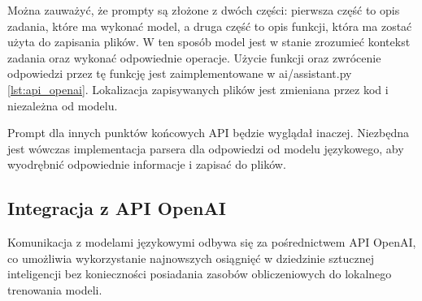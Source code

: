 Można zauważyć, że prompty są złożone z dwóch części: pierwsza część to opis zadania, które ma wykonać model, a druga część to opis funkcji, która ma zostać użyta do zapisania plików. W ten sposób model jest w stanie zrozumieć kontekst zadania oraz wykonać odpowiednie operacje. Użycie funkcji oraz zwrócenie odpowiedzi przez tę funkcję jest zaimplementowane w ai/assistant.py \ref{lst:api_openai}. Lokalizacja zapisywanych plików jest zmieniana przez kod i niezależna od modelu.

Prompt dla innych punktów końcowych API będzie wyglądał inaczej. Niezbędna jest wówczas implementacja parsera dla odpowiedzi od modelu językowego, aby wyodrębnić odpowiednie informacje i zapisać do plików.

\subsection{Integracja z API OpenAI}
Komunikacja z modelami językowymi odbywa się za pośrednictwem API OpenAI, co umożliwia wykorzystanie najnowszych osiągnięć w dziedzinie sztucznej inteligencji bez konieczności posiadania zasobów obliczeniowych do lokalnego trenowania modeli. 

